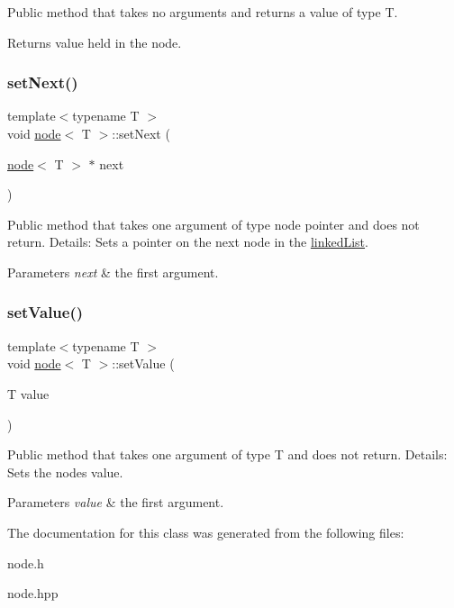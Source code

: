 Public method that takes no arguments and returns a value of type T. \begin{DoxyReturn}{Returns}
value held in the node. 
\end{DoxyReturn}
\mbox{\label{classnode_abfa39769660ee5f0ce6918f0ec6d4a4a}} 
\subsubsection{\texorpdfstring{set\+Next()}{setNext()}}
{\footnotesize\ttfamily template$<$typename T $>$ \\
void \hyperlink{classnode}{node}$<$ T $>$\+::set\+Next (\begin{DoxyParamCaption}\item[{\hyperlink{classnode}{node}$<$ T $>$ $\ast$}]{next }\end{DoxyParamCaption})}

Public method that takes one argument of type node pointer and does not return. Details\+: Sets a pointer on the next node in the \hyperlink{classlinked_list}{linked\+List}. 
\begin{DoxyParams}{Parameters}
{\em next} & the first argument. \\
\hline
\end{DoxyParams}
\mbox{\label{classnode_aa2f5fc0ca069085519055c6efd385144}} 
\subsubsection{\texorpdfstring{set\+Value()}{setValue()}}
{\footnotesize\ttfamily template$<$typename T $>$ \\
void \hyperlink{classnode}{node}$<$ T $>$\+::set\+Value (\begin{DoxyParamCaption}\item[{T}]{value }\end{DoxyParamCaption})}

Public method that takes one argument of type T and does not return. Details\+: Sets the node\textquotesingle{}s value. 
\begin{DoxyParams}{Parameters}
{\em value} & the first argument. \\
\hline
\end{DoxyParams}


The documentation for this class was generated from the following files\+:\begin{DoxyCompactItemize}
\item 
node.\+h\item 
node.\+hpp\end{DoxyCompactItemize}
